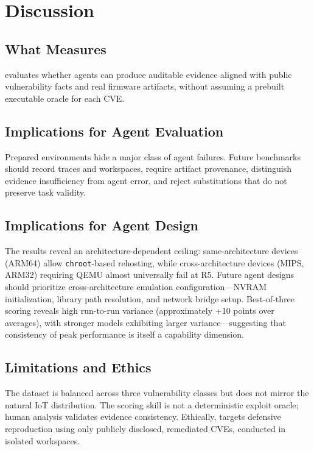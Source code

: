 \section{Discussion}
\subsection{What \sys{} Measures}
\sys{} evaluates whether agents can produce auditable evidence aligned with public vulnerability facts and real firmware artifacts, without assuming a prebuilt executable oracle for each CVE.

\subsection{Implications for Agent Evaluation}
Prepared environments hide a major class of agent failures. Future benchmarks should record traces and workspaces, require artifact provenance, distinguish evidence insufficiency from agent error, and reject substitutions that do not preserve task validity.

\subsection{Implications for Agent Design}
The results reveal an architecture-dependent ceiling: same-architecture devices (ARM64) allow \texttt{chroot}-based rehosting, while cross-architecture devices (MIPS, ARM32) requiring QEMU almost universally fail at R5. Future agent designs should prioritize cross-architecture emulation configuration---NVRAM initialization, library path resolution, and network bridge setup. Best-of-three scoring reveals high run-to-run variance (approximately +10 points over averages), with stronger models exhibiting larger variance---suggesting that consistency of peak performance is itself a capability dimension.

\subsection{Limitations and Ethics}
The dataset is balanced across three vulnerability classes but does not mirror the natural IoT distribution. The scoring skill is not a deterministic exploit oracle; human analysis validates evidence consistency. Ethically, \sys{} targets defensive reproduction using only publicly disclosed, remediated CVEs, conducted in isolated workspaces.
